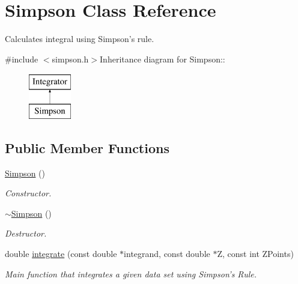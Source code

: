 \hypertarget{classSimpson}{
\section{Simpson Class Reference}
\label{d7/d99/classSimpson}
}


Calculates integral using Simpson's rule.  


{\ttfamily \#include $<$simpson.h$>$}Inheritance diagram for Simpson::\begin{figure}[H]
\begin{center}
\leavevmode
\includegraphics[height=2cm]{d7/d99/classSimpson}
\end{center}
\end{figure}
\subsection*{Public Member Functions}
\begin{DoxyCompactItemize}
\item 
\hypertarget{classSimpson_a67630263e3dafdfaa033f566324b4799}{
\hyperlink{classSimpson_a67630263e3dafdfaa033f566324b4799}{Simpson} ()}
\label{d7/d99/classSimpson_a67630263e3dafdfaa033f566324b4799}

\begin{DoxyCompactList}\small\item\em Constructor. \item\end{DoxyCompactList}\item 
\hypertarget{classSimpson_a92c73e59a11fdf7a156b3682676de6b8}{
\hyperlink{classSimpson_a92c73e59a11fdf7a156b3682676de6b8}{$\sim$Simpson} ()}
\label{d7/d99/classSimpson_a92c73e59a11fdf7a156b3682676de6b8}

\begin{DoxyCompactList}\small\item\em Destructor. \item\end{DoxyCompactList}\item 
double \hyperlink{classSimpson_ab90da2fb197efe2f4a669bf5029a16f4}{integrate} (const double $\ast$integrand, const double $\ast$Z, const int ZPoints)
\begin{DoxyCompactList}\small\item\em Main function that integrates a given data set using Simpson's Rule. \item\end{DoxyCompactList}\end{DoxyCompactItemize}


